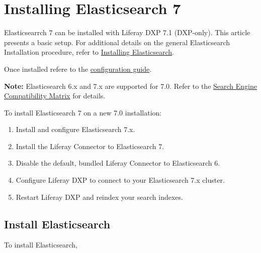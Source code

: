 \chapter{Installing Elasticsearch 7}\label{installing-elasticsearch-7}

Elasticsearrch 7 can be installed with Liferay DXP 7.1 (DXP-only). This
article presents a basic setup. For additional details on the general
Elasticsearch Installation procedure, refer to
\href{/docs/7-1/deploy/-/knowledge_base/d/installing-elasticsearch}{Installing
Elasticsearch}.

Once installed refere to the
\href{/docs/7-1/deploy/-/knowledge_base/d/configuring-the-liferay-elasticsearch-connector}{configuration
guide}.

\noindent\hrulefill

\textbf{Note:} Elasticsearch 6.x and 7.x are supported for 7.0. Refer to
the
\href{https://help.liferay.com/hc/en-us/articles/360016511651\#Liferay-DXP-7.1}{Search
Engine Compatibility Matrix} for details.

\noindent\hrulefill

To install Elasticsearch 7 on a new 7.0 installation:

\begin{enumerate}
\def\labelenumi{\arabic{enumi}.}
\item
  Install and configure Elasticsearch 7.x.
\item
  Install the Liferay Connector to Elasticsearch 7.
\item
  Disable the default, bundled Liferay Connector to Elasticsearch 6.
\item
  Configure Liferay DXP to connect to your Elasticsearch 7.x cluster.
\item
  Restart Liferay DXP and reindex your search indexes.
\end{enumerate}

\section{Install Elasticsearch}\label{install-elasticsearch}

To install Elasticsearch,

